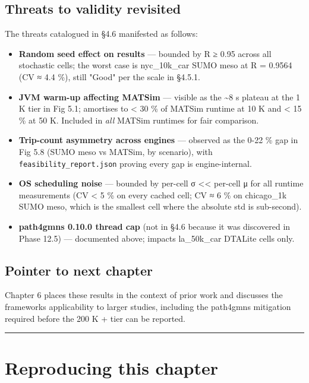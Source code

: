 \subsection{Threats to validity
revisited}\label{threats-to-validity-revisited}

The threats catalogued in §4.6 manifested as follows:

\begin{itemize}
\tightlist
\item
  \textbf{Random seed effect on results} --- bounded by R ≥ 0.95 across
  all stochastic cells; the worst case is nyc\_10k\_car SUMO meso at R =
  0.9564 (CV ≈ 4.4 \%), still "Good" per the scale in §4.5.1.
\item
  \textbf{JVM warm-up affecting MATSim} --- visible as the
  \textasciitilde8 s plateau at the 1 K tier in Fig 5.1; amortises to
  \textless{} 30 \% of MATSim runtime at 10 K and \textless{} 15 \% at
  50 K. Included in \emph{all} MATSim runtimes for fair comparison.
\item
  \textbf{Trip-count asymmetry across engines} --- observed as the 0-22
  \% gap in Fig 5.8 (SUMO meso vs MATSim, by scenario), with
  \texttt{feasibility\_report.json} proving every gap is
  engine-internal.
\item
  \textbf{OS scheduling noise} --- bounded by per-cell σ
  \textless\textless{} per-cell μ for all runtime measurements (CV
  \textless{} 5 \% on every cached cell; CV ≈ 6 \% on chicago\_1k SUMO
  meso, which is the smallest cell where the absolute std is
  sub-second).
\item
  \textbf{path4gmns 0.10.0 thread cap} (not in §4.6 because it was
  discovered in Phase 12.5) --- documented above; impacts la\_50k\_car
  DTALite cells only.
\end{itemize}

\subsection{Pointer to next chapter}\label{pointer-to-next-chapter}

Chapter 6 places these results in the context of prior work and
discusses the framework\textquotesingle s applicability to larger
studies, including the path4gmns mitigation required before the 200 K +
tier can be reported.

\begin{center}\rule{0.5\linewidth}{0.5pt}\end{center}

\section{Reproducing this
chapter}\label{58-reproducing-this-chapter}

